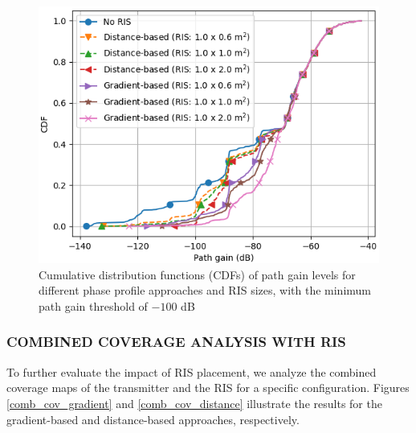 \documentclass{IEEEoj}
\begin{document}
\begin{figure}
	\centering \includegraphics[width=\linewidth]{Sim_Results/CDF_-100dB.png}
	\caption{Cumulative distribution functions (CDFs) of path gain levels for different phase profile approaches and RIS sizes, with the minimum path gain threshold of $-100$ dB}
	\label{CDF_-100dB}
\end{figure}

\subsubsection{COMBINED COVERAGE ANALYSIS WITH RIS}
To further evaluate the impact of RIS placement, we analyze the combined coverage maps of the transmitter and the RIS for a specific configuration. Figures \ref{comb_cov_gradient} and \ref{comb_cov_distance} illustrate the results for the gradient-based and distance-based approaches, respectively.
\end{document}

